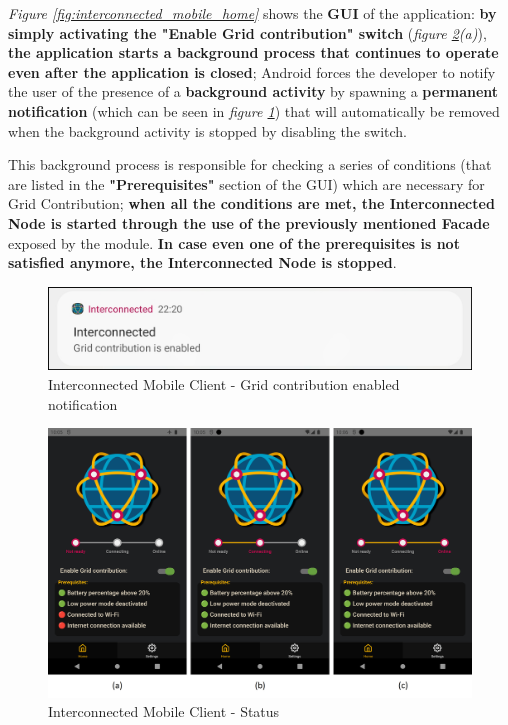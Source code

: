 \textit{Figure \ref{fig:interconnected_mobile_home}} shows the \textbf{GUI} of the application: \textbf{by simply activating the "Enable Grid contribution" switch} (\textit{figure \ref{fig:interconnected_mobile_connection}(a)}), \textbf{the application starts a background process that continues to operate even after the application is closed}; Android forces the developer to notify the user of the presence of a \textbf{background activity} by spawning a \textbf{permanent notification} (which can be seen in \textit{figure \ref{fig:notification_contribution}}) that will automatically be removed when the background activity is stopped by disabling the switch.

This background process is responsible for checking a series of conditions (that are listed in the \textbf{"Prerequisites"} section of the GUI) which are necessary for Grid Contribution; \textbf{when all the conditions are met, the Interconnected Node is started through the use of the previously mentioned Facade} exposed by the module. \textbf{In case even one of the prerequisites is not satisfied anymore, the Interconnected Node is stopped}.

\begin{figure}[!ht]
    \centering
    \includegraphics[scale=0.35]{document/chapters/chapter_7/images/notification_contribution.png}
    \caption{Interconnected Mobile Client - Grid contribution enabled notification}
    \label{fig:notification_contribution}
\end{figure}

\begin{figure}[!ht]
    \centering
    \includegraphics[width=\linewidth]{document/chapters/chapter_7/images/interconnected_mobile_connection.png}
    \caption{Interconnected Mobile Client - Status}
    \label{fig:interconnected_mobile_connection}
\end{figure}

